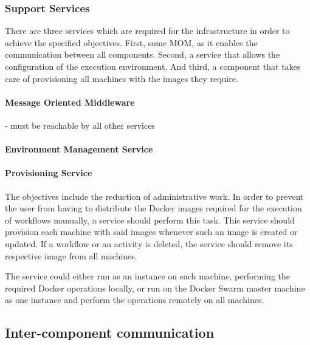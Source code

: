  \subsubsection{Support Services} %
  \label{ssub:support_components}
    There are three services which are required for the infrastructure in order to achieve the specified objectives. First, some \ac{MOM}, as it enables the communication between all components. Second, a service that allows the configuration of the execution environment. And third, a component that takes care of provisioning all machines with the images they require.

    \paragraph{Message Oriented Middleware} %
      \label{par:message_oriented_middleware}
      - must be reachable by all other services

    \paragraph{Environment Management Service} %
      \label{par:environment_management_service}

    \paragraph{Provisioning Service} %
      \label{par:provisioning_service}
        The objectives include the reduction of administrative work. In order to prevent the user from having to distribute the Docker images required for the execution of workflows manually, a service should perform this task. This service should provision each machine with said images whenever such an image is created or updated. If a workflow or an activity is deleted, the service should remove its respective image from all machines.

        The service could either run as an instance on each machine, performing the required Docker operations locally, or run on the Docker Swarm master machine as one instance and perform the operations remotely on all machines.

\subsection{Inter-component communication} %
\label{sub:inter_component_communication}

